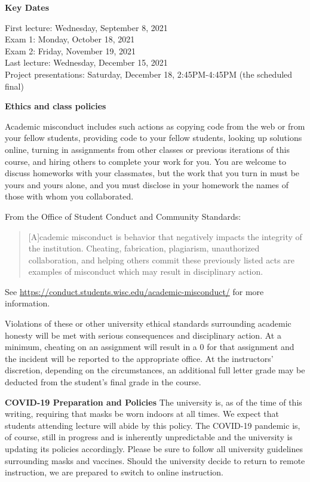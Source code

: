 \documentclass[11pt,oneside]{amsart}
\newcommand{\header}[1]{\bigbreak\textbf{#1}}
\begin{document}
\header{Key Dates}

First lecture: Wednesday, September 8, 2021 \\

Exam 1: Monday, October 18, 2021 \\

Exam 2: Friday, November 19, 2021 \\

Last lecture: Wednesday, December 15,  2021 \\

Project presentations: Saturday, December 18, 2:45PM-4:45PM (the scheduled final)

\header{Ethics and class policies}

Academic misconduct includes such actions as
copying code from the web or from your fellow students,
providing code to your fellow students, looking up solutions online,
turning in assignments from other classes or previous iterations of
this course, and hiring others to complete your work for you.
You are welcome to discuss homeworks with your classmates,
but the work that you turn in must be yours and yours alone,
and you must disclose in your homework
the names of those with whom you collaborated.

From the Office of Student Conduct and Community Standards:
\begin{quote} \small
[A]cademic misconduct is behavior that negatively impacts the integrity of the institution. Cheating, fabrication, plagiarism, unauthorized collaboration, and helping others commit these previously listed acts are examples of misconduct which may result in disciplinary action.
\end{quote}
See {\small \url{https://conduct.students.wisc.edu/academic-misconduct/}}
for more information.

Violations of these or other university ethical standards surrounding academic honesty will be met with serious consequences and disciplinary action.
At a minimum, cheating on an assignment will result in a 0 for that
assignment and the incident will be reported to the appropriate office.
At the instructors' discretion, depending on the circumstances,
an additional full letter grade may be deducted from the student's final
grade in the course.

\header{COVID-19 Preparation and Policies}
The university is, as of the time of this writing, requiring that masks be worn indoors at all times.
We expect that students attending lecture will abide by this policy.
The COVID-19 pandemic is, of course, still in progress and is inherently unpredictable and the university is updating its policies accordingly.
Please be sure to follow all university guidelines surrounding masks and vaccines.
Should the university decide to return to remote instruction, we are prepared to switch to online instruction.
\end{document}
